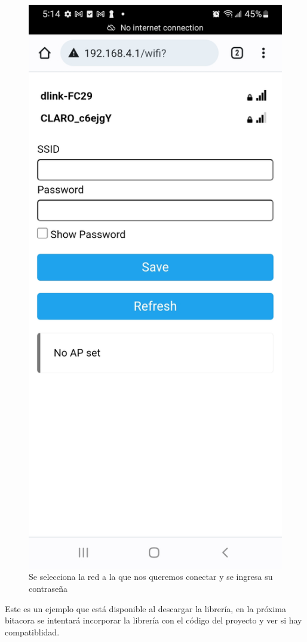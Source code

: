 \documentclass[oneside]{article}
\begin{document}
\begin{figure}[H]
\includegraphics[scale=.15]{images/wifi_selection3.jpg}
\caption{Se selecciona la red a la que nos queremos conectar y se ingresa su contraseña}
\end{figure}

Este es un ejemplo que está disponible al descargar la librería, en la próxima bitacora se intentará incorporar la librería con el código del proyecto y ver si hay compatiblidad.
\end{document}

